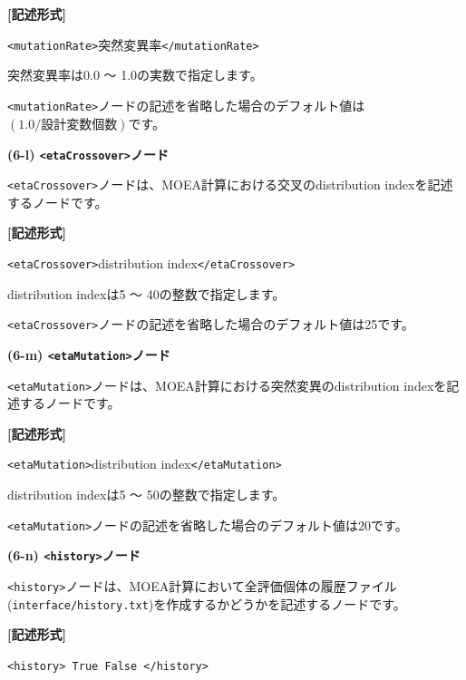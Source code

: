 \documentclass[a4paper,11pt]{jarticle}
\begin{document}
{\vspace{8pt}
\leftskip=12pt
\textbf{[記述形式]}

\leftskip=42pt
\texttt{<mutationRate>}突然変異率\texttt{</mutationRate>}

\vspace{8pt}
\leftskip=0pt
突然変異率は0.0 〜 1.0の実数で指定します。

\texttt{<mutationRate>}ノードの記述を省略した場合のデフォルト値は$(1.0 / 設計変数個数)$です。

\vspace{12pt}
\textbf{(6-l) \texttt{<etaCrossover>}ノード}

\texttt{<etaCrossover>}ノードは、MOEA計算における交叉のdistribution indexを記述するノードです。

\vspace{8pt}
\leftskip=12pt
\textbf{[記述形式]}

\leftskip=42pt
\texttt{<etaCrossover>}distribution index\texttt{</etaCrossover>}

\vspace{8pt}
\leftskip=0pt
distribution indexは5 〜 40の整数で指定します。

\texttt{<etaCrossover>}ノードの記述を省略した場合のデフォルト値は25です。

\vspace{12pt}
\textbf{(6-m) \texttt{<etaMutation>}ノード}

\texttt{<etaMutation>}ノードは、MOEA計算における突然変異のdistribution indexを記述するノードです。

\vspace{8pt}
\leftskip=12pt
\textbf{[記述形式]}

\leftskip=42pt
\texttt{<etaMutation>}distribution index\texttt{</etaMutation>}

\vspace{8pt}
\leftskip=0pt
distribution indexは5 〜 50の整数で指定します。

\texttt{<etaMutation>}ノードの記述を省略した場合のデフォルト値は20です。

\vspace{12pt}
\textbf{(6-n) \texttt{<history>}ノード}

\texttt{<history>}ノードは、MOEA計算において全評価個体の履歴ファイル({\tt interface/history.txt})を作成するかどうかを記述するノードです。

\vspace{8pt}
\leftskip=12pt
\textbf{[記述形式]}

\leftskip=42pt
\texttt{<history> True \textbar{} False </history>}

}
\end{document}
